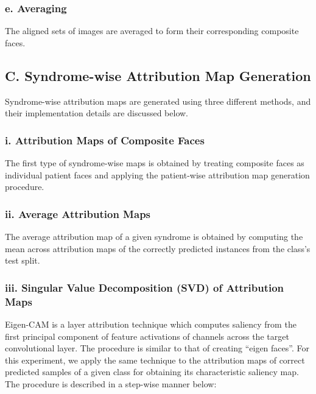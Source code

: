 \documentclass[../report.tex]{subfiles}
\begin{document}
    \subsubsection{e. Averaging}
    The aligned sets of images are averaged to form their corresponding composite faces.
    
    \subsection{C. Syndrome-wise Attribution Map Generation}
        \noindent
    Syndrome-wise attribution maps are generated using three different methods, and their implementation details are discussed below.
    \subsubsection{i. Attribution Maps of Composite Faces}
    The first type of syndrome-wise maps is obtained by treating composite faces as individual patient faces and applying the patient-wise attribution map generation procedure.
    \subsubsection{ii. Average Attribution Maps}
    The average attribution map of a given syndrome is obtained by computing the mean across attribution maps of the correctly predicted instances from the class's test split.
    \subsubsection{iii. Singular Value Decomposition (SVD) of Attribution Maps}
	Eigen-CAM \cite{muhammad2020eigen} is a layer attribution technique which computes saliency from the first principal component of feature activations of channels across the target convolutional layer. The procedure is similar to that of creating \enquote{eigen faces}\cite{eig_faces}. For this experiment, we apply the same technique to the attribution maps of correct predicted samples of a given class for obtaining its characteristic saliency map. The procedure is described in a step-wise manner below:
\end{document}
